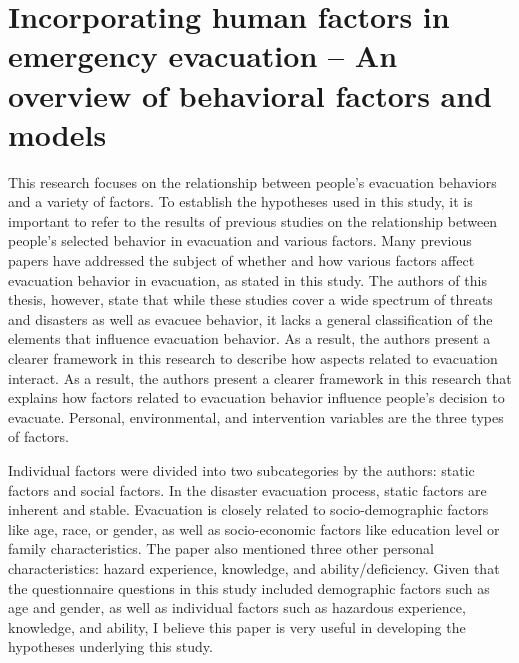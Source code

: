 \section{Incorporating human factors in emergency evacuation – An overview of behavioral factors and models}
This research focuses on the relationship between people's evacuation behaviors and a variety of factors. To establish the hypotheses used in this study, it is important to refer to the results of previous studies on the relationship between people's selected behavior in evacuation and various factors. Many previous papers have addressed the subject of whether and how various factors affect evacuation behavior in evacuation, as stated in this study. The authors of this thesis, however, state that while these studies cover a wide spectrum of threats and disasters as well as evacuee behavior, it lacks a general classification of the elements that influence evacuation behavior. As a result, the authors present a clearer framework in this research to describe how aspects related to evacuation interact. As a result, the authors present a clearer framework in this research that explains how factors related to evacuation behavior influence people's decision to evacuate. Personal, environmental, and intervention variables are the three types of factors. 

Individual factors were divided into two subcategories by the authors: static factors and social factors. In the disaster evacuation process, static factors are inherent and stable. Evacuation is closely related to socio-demographic factors like age, race, or gender, as well as socio-economic factors like education level or family characteristics. The paper also mentioned three other personal characteristics: hazard experience, knowledge, and ability/deficiency. Given that the questionnaire questions in this study included demographic factors such as age and gender, as well as individual factors such as hazardous experience, knowledge, and ability, I believe this paper is very useful in developing the hypotheses underlying this study. 

